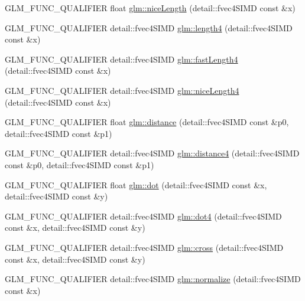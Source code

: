 \begin{DoxyCompactItemize}
G\+L\+M\+\_\+\+F\+U\+N\+C\+\_\+\+Q\+U\+A\+L\+I\+F\+I\+E\+R float \hyperlink{namespaceglm_a34a9cfc7cf7fe9b35911cc3013033e61}{glm\+::nice\+Length} (detail\+::fvec4\+S\+I\+M\+D const \&x)
\item 
G\+L\+M\+\_\+\+F\+U\+N\+C\+\_\+\+Q\+U\+A\+L\+I\+F\+I\+E\+R detail\+::fvec4\+S\+I\+M\+D \hyperlink{namespaceglm_a9de224e4659dd8df0f6cbfe87785ad37}{glm\+::length4} (detail\+::fvec4\+S\+I\+M\+D const \&x)
\item 
G\+L\+M\+\_\+\+F\+U\+N\+C\+\_\+\+Q\+U\+A\+L\+I\+F\+I\+E\+R detail\+::fvec4\+S\+I\+M\+D \hyperlink{namespaceglm_a07438f3a62641a379456e932dd97b090}{glm\+::fast\+Length4} (detail\+::fvec4\+S\+I\+M\+D const \&x)
\item 
G\+L\+M\+\_\+\+F\+U\+N\+C\+\_\+\+Q\+U\+A\+L\+I\+F\+I\+E\+R detail\+::fvec4\+S\+I\+M\+D \hyperlink{namespaceglm_a8279db21d38cadc5efaa0c8efababb1b}{glm\+::nice\+Length4} (detail\+::fvec4\+S\+I\+M\+D const \&x)
\item 
G\+L\+M\+\_\+\+F\+U\+N\+C\+\_\+\+Q\+U\+A\+L\+I\+F\+I\+E\+R float \hyperlink{namespaceglm_ae716903872179576658f5eb6e2632558}{glm\+::distance} (detail\+::fvec4\+S\+I\+M\+D const \&p0, detail\+::fvec4\+S\+I\+M\+D const \&p1)
\item 
G\+L\+M\+\_\+\+F\+U\+N\+C\+\_\+\+Q\+U\+A\+L\+I\+F\+I\+E\+R detail\+::fvec4\+S\+I\+M\+D \hyperlink{namespaceglm_a5256e6d2d2a82b810f92fc02f64819fb}{glm\+::distance4} (detail\+::fvec4\+S\+I\+M\+D const \&p0, detail\+::fvec4\+S\+I\+M\+D const \&p1)
\item 
G\+L\+M\+\_\+\+F\+U\+N\+C\+\_\+\+Q\+U\+A\+L\+I\+F\+I\+E\+R float \hyperlink{namespaceglm_ae84ca0b0e48c6a79faac0eea8bc7a913}{glm\+::dot} (detail\+::fvec4\+S\+I\+M\+D const \&x, detail\+::fvec4\+S\+I\+M\+D const \&y)
\item 
G\+L\+M\+\_\+\+F\+U\+N\+C\+\_\+\+Q\+U\+A\+L\+I\+F\+I\+E\+R detail\+::fvec4\+S\+I\+M\+D \hyperlink{namespaceglm_af55916a3764adaa7537f5e3e9ccacb81}{glm\+::dot4} (detail\+::fvec4\+S\+I\+M\+D const \&x, detail\+::fvec4\+S\+I\+M\+D const \&y)
\item 
G\+L\+M\+\_\+\+F\+U\+N\+C\+\_\+\+Q\+U\+A\+L\+I\+F\+I\+E\+R detail\+::fvec4\+S\+I\+M\+D \hyperlink{namespaceglm_a06a52dedca29da951493c4c6f6020573}{glm\+::cross} (detail\+::fvec4\+S\+I\+M\+D const \&x, detail\+::fvec4\+S\+I\+M\+D const \&y)
\item 
G\+L\+M\+\_\+\+F\+U\+N\+C\+\_\+\+Q\+U\+A\+L\+I\+F\+I\+E\+R detail\+::fvec4\+S\+I\+M\+D \hyperlink{namespaceglm_aabe6e7b8dbd2e5db215f973e474dd951}{glm\+::normalize} (detail\+::fvec4\+S\+I\+M\+D const \&x)
\item 

\end{DoxyCompactItemize}
